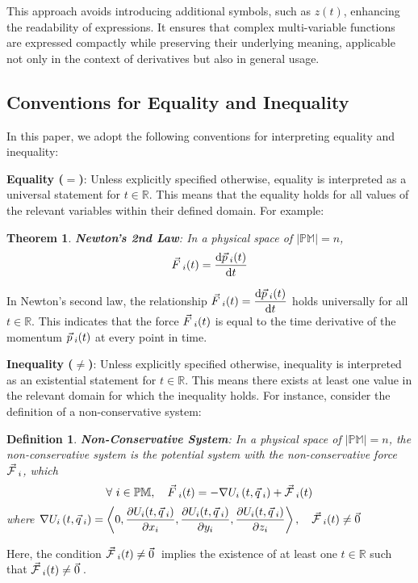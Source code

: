 \documentclass[12pt]{amsart}
\newtheorem*{theorem*}{Theorem}
\newtheorem*{definition*}{Definition}
\let\oldvec\vec
\renewcommand{\vec}[1]{\oldvec{#1}\hspace{0.1em}}
\begin{document}
   This approach avoids introducing additional symbols, such as $z(t)$, enhancing the readability of expressions. It ensures that complex multi-variable functions are expressed compactly while preserving their underlying meaning, applicable not only in the context of derivatives but also in general usage.
   
\subsection{Conventions for Equality and Inequality}

In this paper, we adopt the following conventions for interpreting equality and inequality:

\textbf{Equality ($=$)}: Unless explicitly specified otherwise, equality is interpreted as a universal statement for $t \in \mathbb{R}$. This means that the equality holds for all values of the relevant variables within their defined domain. For example:
    \begin{theorem*}
     \textbf{Newton's 2nd Law}: In a physical space of $\left | \mathbb{PM} \right | = n$, $$ \vec{F}_{i}(t) = \dfrac{\mathrm{d} \vec{p}_{i}(t)}{\mathrm{d} t} $$
    \end{theorem*}
   In Newton's second law, the relationship $\vec{F}_i(t) = \dfrac{\mathrm{d} \vec{p}_i(t)}{\mathrm{d} t}$
   holds universally for all $t \in \mathbb{R}$. This indicates that the force $\vec{F}_i(t)$ is equal to the time derivative of the momentum $\vec{p}_i(t)$ at every point in time.

\textbf{Inequality ($\neq$)}: Unless explicitly specified otherwise, inequality is interpreted as an existential statement for $t \in \mathbb{R}$. This means there exists at least one value in the relevant domain for which the inequality holds. For instance, consider the definition of a non-conservative system:
   \begin{definition*}
    \textbf{Non-Conservative System}: In a physical space of $\left | \mathbb{PM} \right | = n$, the non-conservative system is the potential system with the non-conservative force $\vec{\mathcal{F}}_i$, which $$\forall \  i \in \mathbb{PM}, \quad \vec{F}_i (t) = - \nabla U_i \left ( t, \vec{q}_i  \right) + \vec{\mathcal{F}}_i(t) $$ where $ \nabla  U_i \left ( t, \vec{q}_i \right )  = \left < 0, \dfrac{\partial U_i (t, \vec{q}_i)}{\partial x_i}, \dfrac{\partial U_i (t, \vec{q}_i)}{\partial y_i}, \dfrac{\partial U_i (t, \vec{q}_i)}{\partial z_i} \right >, \quad \vec{\mathcal{F}}_i (t) \ne \vec{0} $
\end{definition*}
   Here, the condition $\vec{\mathcal{F}}_i(t) \neq \vec{0}$ implies the existence of at least one $t \in \mathbb{R}$ such that $\vec{\mathcal{F}}_i(t) \neq \vec{0}$.
\end{document}
